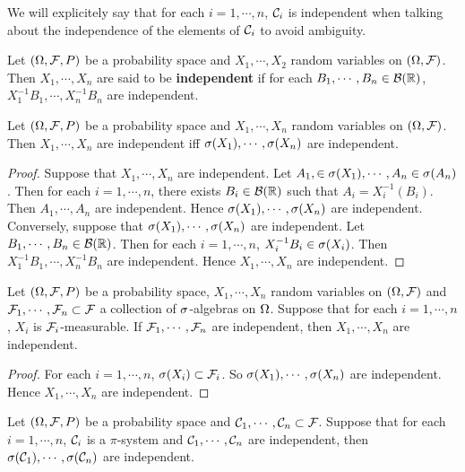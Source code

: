 \documentclass{book}
\begin{document}
	\begin{note}
		We will explicitely say that for each $i=1, \cdots , n$, $\mathcal{C}_i$ is independent when talking about the independence of the elements of $\mathcal{C}_i$ to avoid ambiguity.
	\end{note}
	
	\begin{defn}
		Let $(\Omega, \mathcal{F}, P)$ be a probability space and $X_1, \cdots, X_2$ random variables on $(\Omega, \mathcal{F})$. Then $X_1, \cdots, X_n$ are said to be \textbf{independent} if for each $B_1, \cdots, B_n \in \mathcal{B}(\mathbb{R})$, $X_1^{-1}B_1, \cdots, X_n^{-1}B_n$ are independent.
	\end{defn}
	
	\begin{ex}
		Let $(\Omega, \mathcal{F}, P)$ be a probability space and $X_1, \cdots, X_n$ random variables on $(\Omega, \mathcal{F})$. Then $X_1, \cdots, X_n$ are independent iff $\sigma(X_1), \cdots, \sigma(X_n)$ are independent.
	\end{ex}
	
	\begin{proof}
		Suppose that $X_1, \cdots, X_n$ are independent. Let $A_1, \in \sigma(X_1), \cdots, A_n \in \sigma(A_n)$. Then for each $i = 1, \cdots, n$, there exists $B_i \in \mathcal{B}(\mathbb{R})$ such that $A_i = X_i^{-1}(B_i)$. Then $A_1, \cdots, A_n$ are independent. Hence $\sigma(X_1), \cdots, \sigma(X_n)$ are independent. Conversely, suppose that $\sigma(X_1), \cdots, \sigma(X_n)$ are independent. Let $B_1, \cdots, B_n \in \mathcal{B}(\mathbb{R})$. Then for each $i = 1, \cdots, n$, $X_i^{-1}B_i \in \sigma(X_i)$. Then $X_1^{-1}B_1, \cdots, X_n^{-1}B_n$ are independent. Hence $X_1, \cdots, X_n$ are independent.
	\end{proof}
	
	\begin{ex}
		Let $(\Omega, \mathcal{F}, P)$ be a probability space, $X_1, \cdots, X_n$ random variables on $(\Omega, \mathcal{F})$ and $\mathcal{F}_1, \cdots, \mathcal{F}_n \subset \mathcal{F}$ a collection of $\sigma$-algebras on $\Omega$. Suppose that for each $i = 1, \cdots, n$, $X_i$ is $\mathcal{F}_i$-measurable. If $\mathcal{F}_1, \cdots, \mathcal{F}_n$ are independent, then $X_1, \cdots, X_n$ are independent. 
	\end{ex}
	
	\begin{proof}
		For each $i =1, \cdots, n$, $\sigma(X_i) \subset \mathcal{F}_i$. So $\sigma(X_1), \cdots, \sigma(X_n)$ are independent. Hence $X_1, \cdots, X_n$ are independent.
	\end{proof}
	
	\begin{ex}
		Let $(\Omega, \mathcal{F}, P)$ be a probability space and $\mathcal{C}_1, \cdots, \mathcal{C}_n \subset \mathcal{F}$. Suppose that for each $i = 1, \cdots, n$, $\mathcal{C}_i$ is a $\pi$-system and $\mathcal{C}_1, \cdots, \mathcal{C}_n$ are independent, then $\sigma(\mathcal{C}_1), \cdots, \sigma(\mathcal{C}_n)$ are independent.
	\end{ex}
	
\end{document}
